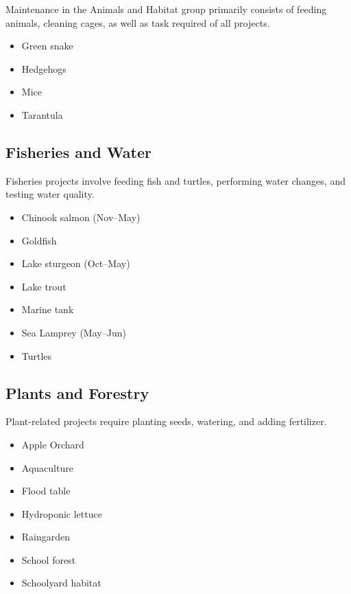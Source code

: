\documentclass[letterpaper,10pt]{memoir}
\begin{document}
Maintenance in the Animals and Habitat group primarily consists of feeding animals, cleaning cages, as well as task required of all projects.

\begin{multicols}{2}\begin{itemize}[label=$-$,parsep=0pt]
\item Green snake
\item Hedgehogs
\item Mice
\item Tarantula
\end{itemize}
\end{multicols}


\subsection*{Fisheries and Water}
%
\noindent Fisheries projects involve feeding fish and turtles, performing water changes, and testing water quality.

\begin{multicols}{2}
\begin{itemize}[label=$-$,parsep=0pt]
\item Chinook salmon (Nov--May)
\item Goldfish
\item Lake sturgeon (Oct--May)
\item Lake trout
\item Marine tank
\item Sea Lamprey (May--Jun)
\item Turtles
\end{itemize}
\end{multicols}


\subsection*{Plants and Forestry}

Plant-related projects require planting seeds, watering, and adding fertilizer.

\begin{multicols}{2}
\begin{itemize}[label=$-$,parsep=0pt]
\item Apple Orchard
\item Aquaculture
\item Flood table
\item Hydroponic lettuce
\item Raingarden
\item School forest
\item Schoolyard habitat
\end{itemize}
\end{multicols}
\end{document}
